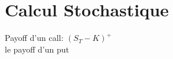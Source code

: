 \documentclass{article}
\begin{document}
\section{Calcul Stochastique}
Payoff d'un call: \((S_T - K)^+\)\\
le payoff d'un put
\end{document}

